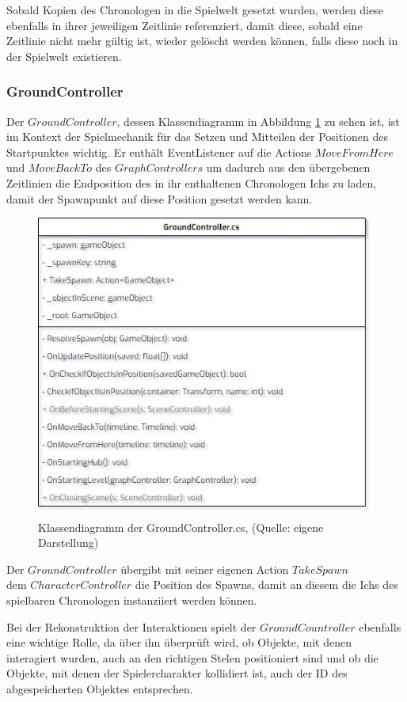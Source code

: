 Sobald Kopien des Chronologen in die Spielwelt gesetzt wurden, werden diese ebenfalls in ihrer jeweiligen Zeitlinie referenziert, damit diese, sobald eine Zeitlinie nicht mehr gültig ist, wieder gelöscht werden können, falls diese noch in der Spielwelt existieren.

\subsubsection{GroundController}
Der $GroundController$, dessen Klassendiagramm in Abbildung \ref{fig:groundCOntroller-cs} zu sehen ist, ist im Kontext der Spielmechanik für das Setzen und Mitteilen der Positionen des Startpunktes wichtig. Er enthält EventListener auf die Actions $MoveFromHere$ und $MoveBackTo$ des $GraphControllers$ um dadurch aus den übergebenen Zeitlinien die Endposition des in ihr enthaltenen Chronologen Ichs zu laden, damit der Spawnpunkt auf diese Position gesetzt werden kann.

\begin{figure}[ht]
\centering
\includegraphics[width=0.6\linewidth]{content/pictures/GroundController.jpg}
\caption{Klassendiagramm der GroundController.cs, (Quelle: eigene Darstellung)}
\label{fig:groundCOntroller-cs}
\end{figure}

Der $GroundController$ übergibt mit seiner eigenen Action $TakeSpawn$ \\ dem $CharacterController$ die Position des Spawns, damit an diesem die Ichs des spielbaren Chronologen instanziiert werden können.

Bei der Rekonstruktion der Interaktionen spielt der $GroundCountroller$ ebenfalls eine wichtige Rolle, da über ihn überprüft wird, ob Objekte, mit denen interagiert wurden, auch an den richtigen Stelen positioniert sind und ob die Objekte, mit denen der Spielercharakter kollidiert ist, auch der \ac{ID} des abgespeicherten Objektes entsprechen.

